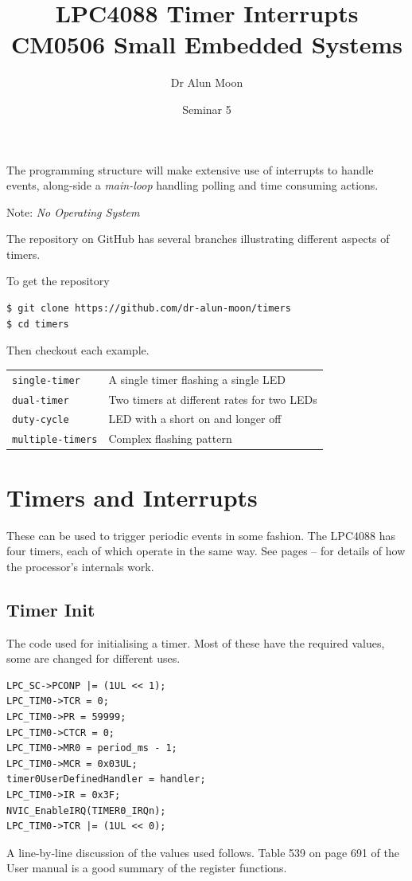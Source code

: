\documentclass[a4paper]{tufte-handout}
\title{LPC4088 Timer Interrupts\\\small{CM0506 Small Embedded Systems}}
\author{Dr Alun Moon}
\date{Seminar 5}
\begin{document}
\maketitle

The programming structure will make extensive use of interrupts to
handle events, along-side a \emph{main-loop} handling polling and time
consuming actions.

Note: \emph{No Operating System}
\begin{tcolorbox}[colframe=SkyBlue,title=GitHub]
  The repository on GitHub has several branches illustrating different
  aspects of timers.
  
  To get the repository
  \begin{verbatim}
$ git clone https://github.com/dr-alun-moon/timers
$ cd timers
\end{verbatim}
Then checkout each example.\\
\begin{tabular}{ll}
  \texttt{single-timer} & A single timer flashing a single LED\\
  \texttt{dual-timer} & Two timers at different rates for two LEDs\\
  \texttt{duty-cycle} &  LED with a short on and longer off\\
  \texttt{multiple-timers} & Complex flashing pattern \\
\end{tabular}
\end{tcolorbox}
\section{Timers and Interrupts}
  These can be used to trigger periodic
events in some fashion.  The LPC4088 has four timers, each of which
operate in the same way.  See pages
\pageref{sec:timer-behavior}--\pageref{sec:timer-behavior-end} for
details of how the processor's internals work.

\subsection{Timer Init}
The code used for initialising a  timer.  Most of these have the
required values, some are changed for different uses.  
\begin{verbatim}
LPC_SC->PCONP |= (1UL << 1);
LPC_TIM0->TCR = 0;
LPC_TIM0->PR = 59999;
LPC_TIM0->CTCR = 0;
LPC_TIM0->MR0 = period_ms - 1;
LPC_TIM0->MCR = 0x03UL;
timer0UserDefinedHandler = handler;
LPC_TIM0->IR = 0x3F;
NVIC_EnableIRQ(TIMER0_IRQn);
LPC_TIM0->TCR |= (1UL << 0);
\end{verbatim}
A line-by-line discussion of the values used follows.  Table 539 on
page 691 of the User manual \citep{lpc4088} is a good summary of the
register functions.
\end{document}
